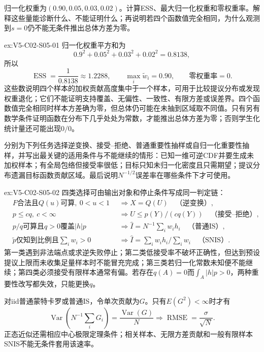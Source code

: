 \begin{SLChapterExercisePairSection}
\begin{exercise}\label{ex:V5-C02-S05-01}
归一化权重为$(0.90,0.05,0.03,0.02)$。计算ESS、最大归一化权重和零权重率。解释这些量能诊断什么、不能证明什么；再说明若四个函数值完全相同，为什么观测到$s=0$仍不能无条件推出总体方差为零。
\end{exercise}
\ifSLFullEdition
{}\label{sol:V5-C02-S05-01}
\begin{chapterexercisesolution}{ex:V5-C02-S05-01}
归一化权重平方和为
\[
0.9^2+0.05^2+0.03^2+0.02^2=0.8138,
\]
所以
\[
\operatorname{ESS}=\frac1{0.8138}\approx1.2288,
\qquad
\max_i\widetilde w_i=0.90,
\qquad
\text{零权重率}=0.
\]
这些数说明四个样本的加权贡献高度集中于一个样本，可用于比较提议分布或发现权重退化；它们不能证明支持覆盖、无偏性、一致性、有限方差或误差界。四个函数值完全相同时样本方差确为零，但总体仍可能在未抽到区域取不同值。只有另有数学条件证明函数在分布下几乎处处为常数，才能推出总体方差为零；否则学生化统计量还可能出现$0/0$。
\end{chapterexercisesolution}
\fi

\begin{exercise}\label{ex:V5-C02-S05-02}
分别为下列任务选择逆变换、接受--拒绝、普通重要性抽样或自归一化重要性抽样，并写出最关键的适用条件与不能继续的情形：已知一维可逆CDF并要生成未加权样本；有全局包络但接受率很低；目标只知未归一化密度且只需期望；提议分布遗漏目标函数贡献区域。最后说明$N^{-1/2}$误差率在哪些条件下才可使用。
\end{exercise}
\ifSLFullEdition
{}\label{sol:V5-C02-S05-02}
\begin{chapterexercisesolution}{ex:V5-C02-S05-02}
四类选择可由输出对象和停止条件写成同一判定链：
\[
\begin{aligned}
&F\text{合法且}Q(u)\text{可算},\ 0<u<1
&&\Longrightarrow X=Q(U)\quad\text{（逆变换）},\\
&p\le cq,\ c<\infty
&&\Longrightarrow U\le p(Y)/(cq(Y))\quad\text{（接受--拒绝）},\\
&p/q\text{可算且}q>0\text{覆盖}|h|p
&&\Longrightarrow \widehat I=N^{-1}\sum_iw_ih_i\quad\text{（普通IS）},\\
&\widetilde p\text{仅知到比例且}\sum_iw_i>0
&&\Longrightarrow \widehat I=\sum_iw_ih_i/\sum_iw_i\quad\text{（SNIS）}.
\end{aligned}
\]
第一类遇到非法端点或求逆失败停止；第二类低接受率不破坏正确性，但达到预设提议上限而未收集足量样本时不能冒充完成；第三类若归一化常数未知便不能继续；第四类必须接受有限样本通常有偏。若存在$q(A)=0$而$\int_A|h|p>0$，两种重要性改写都失效，只能更换$q$。

对iid普通蒙特卡罗或普通IS，令单次贡献为$G$。只有$E(G^2)<\infty$时才有
\[
\operatorname{Var}(N^{-1}\textstyle\sum_iG_i)=\frac{\operatorname{Var}(G)}N
\Longrightarrow \operatorname{RMSE}=\frac{\sigma}{\sqrt N}.
\]
正态近似还需相应中心极限定理条件；相关样本、无限方差贡献和一般有限样本SNIS不能无条件套用该速率。
\end{chapterexercisesolution}
\fi

\end{SLChapterExercisePairSection}
